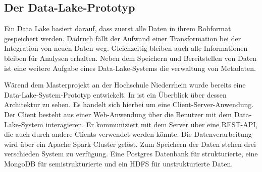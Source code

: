 \subsection{Der Data-Lake-Prototyp}
Ein Data Lake basiert darauf, dass zuerst alle Daten in ihrem Rohformat gespeichert werden.
Dadruch fällt der Aufwand einer Transformation bei der Integration von neuen Daten weg.
Gleichzeitig bleiben auch alle Informationen bleiben für Analysen erhalten\parencite{datalake_03}.
Neben dem Speichern und Bereitstellen von Daten ist eine weitere Aufgabe eines Data-Lake-Systems die verwaltung von Metadaten.


Wärend dem Masterprojekt  \parencite{prototyp} an der Hochschule Niederrhein wurde bereits eine Data-Lake-System-Prototyp entwickelt.
In  ist ein Überblick über dessen Architektur zu sehen.
Es handelt sich hierbei um eine Client-Server-Anwendung.
Der Client besteht aus einer Web-Anwendung über die Benutzer mit dem Data-Lake-System interagieren.
Er kommuniziert mit dem Server über eine REST-API, die auch durch andere Clients verwendet werden könnte.
Die Datenverarbeitung wird über ein Apache Spark Cluster gelöst.
Zum Speichern der Daten stehen drei verschieden System zu verfügung.
Eine Postgres Datenbank für strukturierte, eine MongoDB für semistrukturierte und ein HDFS für unstrukturierte Daten.

